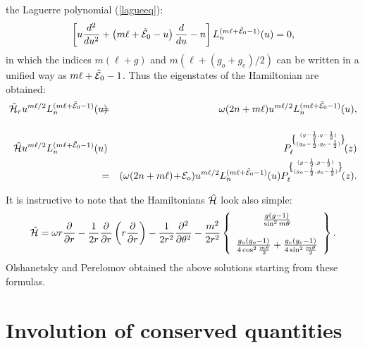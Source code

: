 \documentclass[a4paper,12pt]{article}
\begin{document}
the Laguerre polynomial
(\ref{lagueeq}):
\[
   \left[u{d^2\over{du^2}}+\left(m\ell+\tilde{\cal
   E}_0-u\right){d\over{du}}-n\right]L^{(m\ell+\tilde{\cal
   E}_0-1)}_n(u)=0,
\]
in which the indices \(m(\ell+g)\) and \(m(\ell+(g_o+g_e)/2)\) can be
written
in a unified way as
\(m\ell+\tilde{\cal E}_0-1\).
Thus the eigenstates of the Hamiltonian are obtained:
\begin{eqnarray}
   \tilde{\cal H}_ru^{m\ell/2}L^{(m\ell+\tilde{\cal
   E}_0-1)}_n(u)\hspace{-.3cm}&=&\hspace{-.3cm}
   \omega(2n+m\ell)u^{m\ell/2}L^{(m\ell+\tilde{\cal
   E}_0-1)}_n(u),\\[12pt]
   \hat{\cal H}u^{m\ell/2}L^{(m\ell+\tilde{\cal
   E}_0-1)}_n(u)\hspace{-.3cm}&&\hspace{-.7cm}
   P_{\ell}^{{(g-{1\over2},g-{1\over2})
   \brace(g_o-{1\over2},g_e-{1\over2})}}\!(z)\\
   &=&\left(\omega(2n+m\ell)\!+\!{\cal E}_o\right)
   \!u^{m\ell/2}L^{(m\ell+\tilde{\cal
   E}_0-1)}_n(u)P_{\ell}^{{(g-{1\over2},g-{1\over2})
   \brace(g_o-{1\over2},g_e-{1\over2})}}\!(z).
   \nonumber
\end{eqnarray}

It is instructive to note that the Hamiltonians \(\hat{\cal H}\)
look also simple:
\begin{equation}
   \hat{\cal H}=\omega r{\partial\over{\partial
   r}}
   -{1\over2r}{\partial\over{\partial r}}
   \left(r{\partial\over{\partial r}}
   \right)
   -{1\over2r^2}{\partial^2\over{\partial\theta^2}}
   -{m^2\over2r^2}\left\{\begin{array}{c}
   {g(g-1)\over{\sin^2m\theta}}\\[12pt]
   {g_o(g_o-1)\over{4\cos^2{m\theta\over2}}}+
   {g_e(g_e-1)\over{4\sin^2{m\theta\over2}}}
   \end{array}
   \right\}.
\end{equation}
Olshanetsky and Perelomov \cite{OP2} obtained the above solutions
starting from these formulas.

\section{Involution of conserved quantities}
\label{invopr}
\setcounter{equation}{0}
\end{document}
